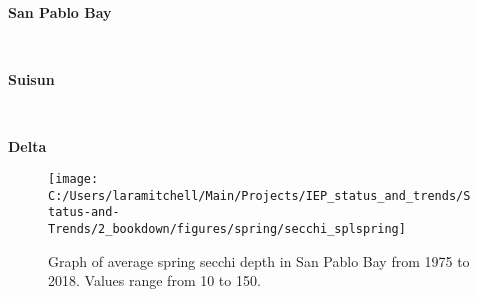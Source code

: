\documentclass[
]{book}
\begin{document}
\begin{panel-grid}

\begin{columns-nocenter}

\begin{column800}

\textbf{San Pablo Bay}

\end{column800}

\begin{column40}

~

\end{column40}

\begin{column800}

\textbf{Suisun}

\end{column800}

\begin{column40}

~

\end{column40}

\begin{column800}

\textbf{Delta}

\end{column800}

\end{columns-nocenter}

\begin{columns-nocenter}

\begin{column800}

\begin{expand}

\begin{figure}
\texttt{[image: C:/Users/laramitchell/Main/Projects/IEP\_status\_and\_trends/Status-and-Trends/2\_bookdown/figures/spring/secchi\_splspring]} \caption{Graph of average spring secchi depth in San Pablo Bay from 1975 to 2018. Values range from 10 to 150.}\label{fig:unnamed-chunk-8}
\end{figure}

\end{expand}

\end{column800}

\begin{column40}

~


\end{column40}
\end{columns-nocenter}
\end{panel-grid}
\end{document}
